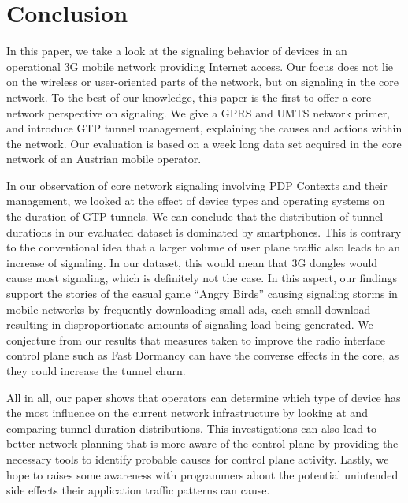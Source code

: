 \section{Conclusion}
\label{sec:conclusion-CONEXT}
\acresetall
In this paper, we take a look at the signaling behavior of devices in an operational \ac{3G} mobile network providing Internet access. Our focus does not lie on the wireless or user-oriented parts of the network, but on signaling in the core network. To the best of our knowledge, this paper is the first to offer a core network perspective on signaling. We give a \ac{GPRS} and \ac{UMTS} network primer, and introduce \ac{GTP} tunnel management, explaining the causes and actions within the network. Our evaluation is based on a week long data set acquired in the core network of an Austrian mobile operator.

In our observation of core network signaling involving PDP Contexts and their management, we looked at the effect of device types and operating systems on the duration of GTP tunnels. We can conclude that the distribution of tunnel durations in our evaluated dataset is dominated by smartphones. This is contrary to the conventional idea that a larger volume of user plane traffic also leads to an increase of signaling. In our dataset, this would mean that 3G dongles would cause most signaling, which is definitely not the case. In this aspect, our findings support the stories of the casual game ``Angry Birds'' causing signaling storms in mobile networks by frequently downloading small ads, each small download resulting in disproportionate amounts of signaling load being generated. We conjecture from our results that measures taken to improve the radio interface control plane such as Fast Dormancy can have the converse effects in the core, as they could increase the tunnel churn.

All in all, our paper shows that operators can determine which type of device has the most influence on the current network infrastructure by looking at and comparing tunnel duration distributions. %
This investigations can also lead to better network planning that is more aware of the control plane by providing the necessary tools to identify probable causes for control plane activity. Lastly, we hope to raises some awareness with programmers about the potential unintended side effects their application traffic patterns can cause.

